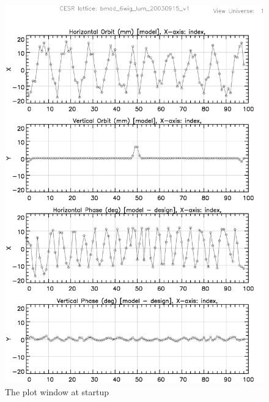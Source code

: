\begin{figure}
  \centering
  \includegraphics[width=5in]{plot-page1.eps}
  \caption{The plot window at startup}
  \label{f:plot.begin}
\end{figure}

